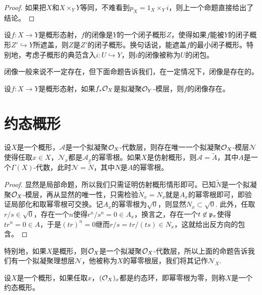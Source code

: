 \begin{proof}
如果把$X$和$X\times_Y Y$等同，不难看到$p_X=1_X\times_Y i$，则上一个命题直接给出了结论。
\end{proof}

\begin{para}[闭像与闭包]
	设$f:X\to Y$是概形态射，$f$的闭像是$Y$的一个闭子概形$Z$，使得如果$f$能被$Y$的闭子概形$Z'\hookrightarrow Y$所遮盖，则$Z$是$Z'$的闭子概形。换句话说，能遮盖$f$的最小闭子概形。特别地，考虑子概形的典范含入$i:U\hookrightarrow Y$，则$i$的闭像被称为$U$的闭包。
\end{para}

闭像一般来说不一定存在，但下面命题告诉我们，在一定情况下，闭像是存在的。

\begin{pro}
	设$f:X\to Y$是概形态射，如果$f_*\mathcal{O}_X$是拟凝聚$\mathcal{O}_Y$-模层，则$f$的闭像存在。
\end{pro}

\section{约态概形}

\begin{pro}
	设$X$是一个概形，$\mathcal A$是一个拟凝聚$\mathcal{O}_X$-代数层，则存在唯一一个拟凝聚$\mathcal{O}_X$-模层$\mathcal N$使得任取$x\in X$，$\mathcal N_x$都是$\mathcal A_x$的幂零根。如果$X$是仿射概形，则$\mathcal A=\widetilde{A}$，其中$A$是一个$\Gamma(X)$-代数，此时$\mathcal N=\widetilde{N}$，其中$N$是$A$的幂零根。
\end{pro}

\begin{proof}
	显然是局部命题，所以我们只需证明仿射概形情形即可。已知$\widetilde{N}$是一个拟凝聚$\mathcal{O}_X$-模层，再从显然的唯一性，只需检验$\widetilde{N}_x=N_x$就是$A_x$的幂零根即可，即验证局部化和取幂零根可交换。记$A_x$的幂零根为$\sqrt{0}$，则显然$N_x\subset \sqrt{0}$. 此外，任取$r/s\in \sqrt{0}$，存在一个$n$使得$r^n/s^n=0\in A_x$，换言之，存在一个$t\not\in \mathfrak{p}_x$使得$tr^n=0\in A$，于是$(tr)^n=0$继而$r/s=tr/(ts)\in N_x$，这就给出反方向的包含。
\end{proof}

\begin{para}[幂零根层]
	特别地，如果$X$是概形，则$\mathcal{O}_X$是一个拟凝聚$\mathcal{O}_X$-代数层，所以上面的命题告诉我们有一个拟凝聚理想层$\mathcal N$，他被称为$X$的幂零根层，我们将其记作$\mathcal N_X$.
\end{para}

\begin{para}[约态概形]
	设$X$是一个概形，如果任取$x$，$(\mathcal{O}_X)_x$都是约态环，即幂零根为零，则称$X$是一个约态概形。
\end{para}

